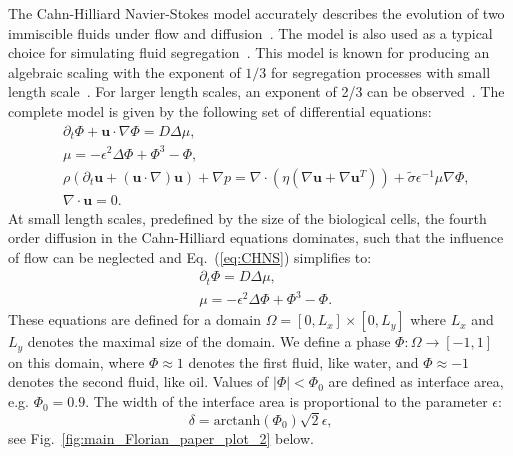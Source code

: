 \documentclass[10pt,letterpaper]{article}
\renewcommand{\eqref}[1]{Eq.~(\ref{eq:#1})}
\newcommand{\figref}[1]{Fig.~\ref{fig:#1}}
\begin{document}
The Cahn-Hilliard Navier-Stokes model accurately describes the evolution of
two immiscible fluids under flow and
diffusion~\cite{AlaBodHahKliWeiWel2013, AlaVoi2012}. The model is also used
as a typical choice for simulating fluid
segregation~\cite{WitBacVoi2012, VooGli1988, Voo1985, RogDes1989}. This
model is known for producing an algebraic scaling with the exponent of $1/3$
for segregation processes with small length
scale~\cite{GarNieRum2003, NasNar2017}. For larger length scales, an
exponent of 2/3 can be observed~\cite{NasNar2017}. The complete model is
given by the following set of differential equations:
%
\begin{equation}
  \label{eq:CHNS}
  \begin{aligned}
    & \partial_t\Phi+\textbf{u}\cdot\nabla\Phi = D\Delta\mu \text{,}\\
    & \mu = -\epsilon^2\Delta\Phi+\Phi^3-\Phi \text{,}\\
    & \rho(\partial_t\textbf{u} + (\textbf{u}\cdot\nabla)\textbf{u}) + \nabla p = \nabla \cdot(\eta(\nabla \textbf{u}+\nabla \textbf{u}^T)) + \tilde{\sigma}\epsilon^{-1}\mu\nabla\Phi \text{,}\\
    & \nabla \cdot \textbf{u} = 0\text{.}
  \end{aligned}
\end{equation}
%
At small length scales, predefined by the size of the biological cells, the
fourth order diffusion in the Cahn-Hilliard equations dominates, such that
the influence of flow can be neglected and \eqref{CHNS} simplifies to:
%
\begin{equation}
  \begin{aligned}
    &\partial_t\Phi = D\Delta\mu \text{,}\\
    &\mu = -\epsilon^2\Delta\Phi+\Phi^3-\Phi \text{.}
  \end{aligned}
\end{equation}
%
These equations are defined for a domain $\Omega=[0,L_x]\times[0,L_y]$ where
$L_x$ and $L_y$ denotes the maximal size of the domain. We define a phase
$\Phi:\Omega\rightarrow[-1,1]$ on this domain, where $\Phi\approx 1$ denotes
the first fluid, like water, and $\Phi\approx -1$ denotes the second fluid,
like oil. Values of $|\Phi| < \Phi_0$ are defined as interface area, e.g.
$\Phi_0=0.9$. The width of the interface area is proportional to the
parameter $\epsilon$:
%
\begin{equation}
    \label{eq:main_Florian_paper_plot_2}
    \delta = \text{arctanh}(\Phi_0)\sqrt{2}\epsilon\text{,}
\end{equation}
%
see \figref{main_Florian_paper_plot_2} below.
\end{document}
